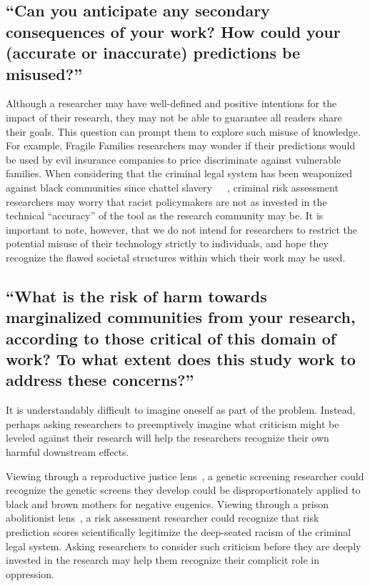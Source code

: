 \documentclass[12pt]{article}
\begin{document}
	\subsection{``Can you anticipate any secondary consequences of your work? How could your (accurate or inaccurate) predictions be misused?''}
	    
	    Although a researcher may have well-defined and positive intentions for the impact of their research, they may not be able to guarantee all readers share their goals. This question can prompt them to explore such misuse of knowledge. For example, Fragile Families researchers may wonder if their predictions would be used by evil insurance companies to price discriminate against vulnerable families. When considering that the criminal legal system has been weaponized against black communities since chattel slavery~\cite{new-jim-crow}~\cite{abolition-constitutionalism}~\cite{race-after-tech}, criminal risk assessment researchers may worry that racist policymakers are not as invested in the technical ``accuracy'' of the tool as the research community may be. It is important to note, however, that we do not intend for researchers to restrict the potential misuse of their technology strictly to individuals, and hope they recognize the flawed societal structures within which their work may be used. 

	\subsection{``What is the risk of harm towards marginalized communities from your research, according to those critical of this domain of work? To what extent does this study work to address these concerns?''}
	
		It is understandably difficult to imagine oneself as part of the problem. Instead, perhaps asking researchers to preemptively imagine what criticism might be leveled against their research will help the researchers recognize their own harmful downstream effects. 
		
		Viewing through a reproductive justice lens~\cite{welchPhD}, a genetic screening researcher could recognize the genetic screens they develop could be disproportionately applied to black and brown mothers for negative eugenics. Viewing through a prison abolitionist lens~\cite{prisons-obsolete}, a risk assessment researcher could recognize that risk prediction scores scientifically legitimize the deep-seated racism of the criminal legal system. Asking researchers to consider such criticism before they are deeply invested in the research may help them recognize their complicit role in oppression. 
		
\end{document}
